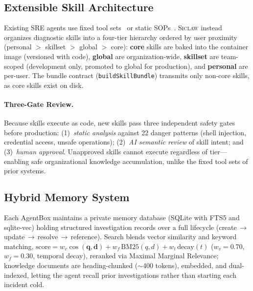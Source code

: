 \documentclass[letterpaper]{article}
\newcommand{\sys}{\textsc{Siclaw}}
\begin{document}
\subsection{Extensible Skill Architecture}
\label{sec:skills}

Existing SRE agents use fixed tool sets~\cite{chen2025aiopslab,clark2026sregym} or static SOPs~\cite{pei2025flowofaction}. \sys{} instead organizes diagnostic skills into a four-tier hierarchy ordered by user proximity (personal $>$ skillset $>$ global $>$ core): \textbf{core} skills are baked into the container image (versioned with code), \textbf{global} are organization-wide, \textbf{skillset} are team-scoped (development only, promoted to global for production), and \textbf{personal} are per-user. The bundle contract (\texttt{buildSkillBundle}) transmits only non-core skills, as core skills exist on disk.

\paragraph{Three-Gate Review.}
Because skills execute as code, new skills pass three independent safety gates before production: (1)~\emph{static analysis} against 22 danger patterns (shell injection, credential access, unsafe operations); (2)~\emph{AI semantic review} of skill intent; and (3)~\emph{human approval}. Unapproved skills cannot execute regardless of tier---enabling safe organizational knowledge accumulation, unlike the fixed tool sets of prior systems.


\subsection{Hybrid Memory System}
\label{sec:memory}

Each AgentBox maintains a private memory database (SQLite with FTS5 and sqlite-vec) holding structured investigation records over a full lifecycle (create\,$\rightarrow$\,update\,$\rightarrow$\,resolve\,$\rightarrow$\,reference). Search blends vector similarity and keyword matching, $\text{score}=w_v\cos(\mathbf{q},\mathbf{d})+w_f\,\text{BM25}(q,d)+w_t\,\text{decay}(t)$ ($w_v{=}0.70$, $w_f{=}0.30$, temporal decay), reranked via Maximal Marginal Relevance; knowledge documents are heading-chunked ($\sim$400 tokens), embedded, and dual-indexed, letting the agent recall prior investigations rather than starting each incident cold.
\end{document}
